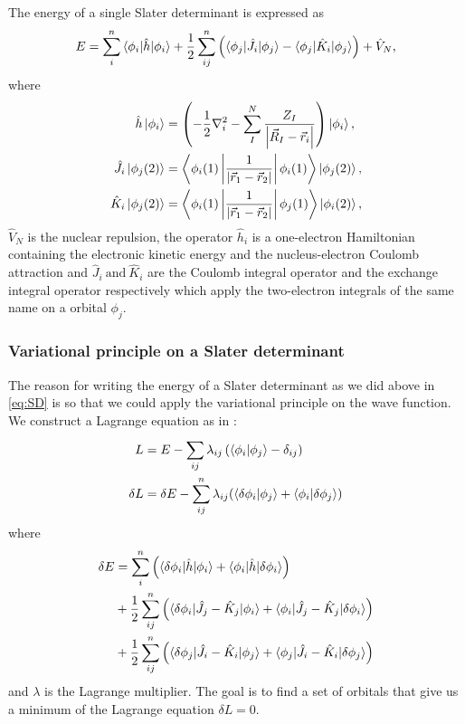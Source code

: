 \documentclass[../master_thesis.tex]{subfiles}
\begin{document}
The energy of a single Slater determinant is expressed as
\begin{equation}
  E = \sumdef[n]{i} \braket{\phi_i|\hat{h}|\phi_i} + \frac{1}{2} \sumdef[n]{ij}\left(\braket{\phi_j|\hat{J}_{i}|\phi_j}
  - \braket{\phi_j|\hat{K}_{i}|\phi_j}\right) + \hat{V}_{N}\text{,}\label{eq:SD}
\end{equation}
where
\begin{align}
\hat{h}\ket{\phi_i} &= \left(-\frac{1}{2}\nabla^2_i - \sumdef[N]{I}\frac{Z_I}{\abs{\Rvec_I - \rvec_i}}\right)\ket{\phi_i},\\
\hat{J}_{i}\ket{\phi_j(2)} &= \left\langle\phi_i(1)\left|\frac{1}{\abs{\rvec_1 - \rvec_2}}\right|\phi_i(1)\right\rangle \ket{\phi_j(2)},\\
\hat{K}_{i}\ket{\phi_j(2)} &= \left\langle\phi_i(1)\left|\frac{1}{\abs{\rvec_1 - \rvec_2}}\right|\phi_j(1)\right\rangle\ket{\phi_i(2)},
\end{align}
$\hat{V}_N$ is the nuclear repulsion, the operator $\hat{h}_i$ is a one-electron Hamiltonian
containing the electronic kinetic energy and the nucleus-electron Coulomb attraction and
$\hat{J}_i\ \text{and}\ \hat{K}_i$ are the Coulomb integral operator and the exchange integral operator
respectively \cite{Jensen:1999, Cramer:2004} which apply the two-electron integrals of the same name on a
orbital $\phi_j$.

\subsubsection{Variational principle on a Slater determinant}

The reason for writing the energy of a Slater determinant as we did above in \ref{eq:SD}
is so that we could apply the variational principle on the wave function. We
construct a Lagrange equation as in \cite{Jensen:1999}:
\begin{align}
  L &= E - \sumdef{ij}\lambda_{ij}\left(\braket{\phi_i|\phi_j} - \delta_{ij} \right) \\
  \delta L &= \delta E - \sumdef[n]{ij} \lambda_{ij}(\braket{\delta\phi_i|\phi_j} + \braket{\phi_i|\delta\phi_j})\label{eq:dlagrange}
\end{align}
where
\begin{align}\label{eq:dESD}
  \begin{split}
    \delta E &= \sumdef[n]{i}\left(\braket{\delta\phi_i|\hat{h}|\phi_i} + \braket{\phi_i|\hat{h}|\delta\phi_i}\right)\\
    &+ \frac{1}{2}\sumdef[n]{ij}\left(\braket{\delta\phi_i|\hat{J}_j - \hat{K}_j|\phi_i} + \braket{\phi_i|\hat{J}_j - \hat{K}_j|\delta\phi_i}\right)\\
    &+ \frac{1}{2}\sumdef[n]{ij}\left(\braket{\delta\phi_j|\hat{J}_i - \hat{K}_i|\phi_j} + \braket{\phi_j|\hat{J}_i - \hat{K}_i|\delta\phi_j}\right)
  \end{split}
\end{align}
and  $\lambda$ is the Lagrange multiplier.
The goal is to find a set of orbitals that give us a minimum of the Lagrange
equation $\delta L = 0$.
\end{document}
